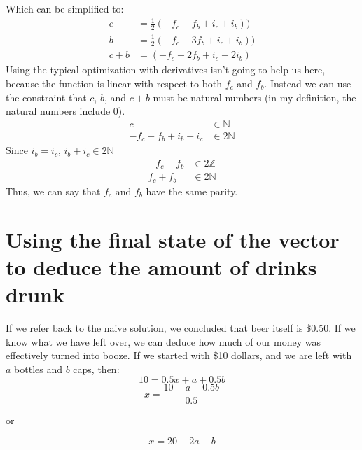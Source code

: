 \documentclass[letterpaper, 12pt]{article}
\begin{document}
Which can be simplified to:
\begin{align*}
    c &= \frac{1}{2}(-f_c - f_b  + i_c + i_b))\\
    b &= \frac{1}{2}(-f_c - 3f_b + i_c + i_b))\\
    c + b &= (-f_c - 2f_b + i_c + 2i_b)
\end{align*}
Using the typical optimization with derivatives isn't going to help us here, because the function is linear with respect to both $f_c$ and $f_b$.
Instead we can use the constraint that $c$, $b$, and $c + b$ must be natural numbers (in my definition, the natural numbers include 0).
\begin{align*}
    c &\in \mathbb{N} \\
    -f_c - f_b + i_b + i_c &\in 2\mathbb{N}
\end{align*}
Since $i_b = i_c$, $i_b + i_c \in 2\mathbb{N}$
\begin{align*}
    -f_c - f_b &\in 2\mathbb{Z}\\
    f_c + f_b &\in 2\mathbb{N}
\end{align*}
Thus, we can say that $f_c$ and $f_b$ have the same parity.
\section{Using the final state of the vector to deduce the amount of drinks drunk}
\par If we refer back to the naive solution, we concluded that beer itself is \$0.50.
If we know what we have left over, we can deduce how much of our money was effectively turned into booze.
If we started with \$10 dollars, and we are left with $a$ bottles and $b$ caps, then:
$$10 = 0.5x + a + 0.5b$$
$$x = \frac{10 - a - 0.5b}{0.5}$$
\begin{center}
    or 
\end{center}
\begin{equation}
x = 20 - 2a - b
\end{equation}
\end{document}
